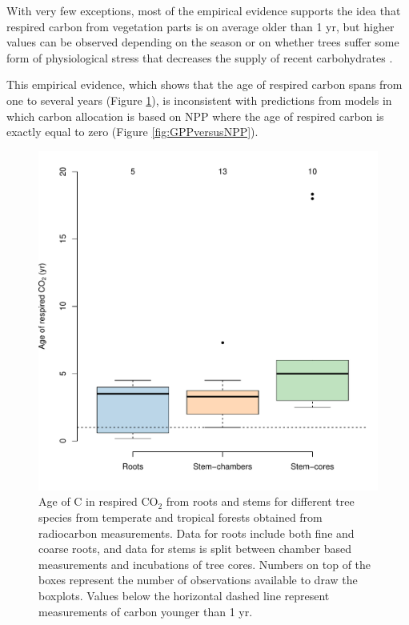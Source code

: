 \documentclass[bg, manuscript]{copernicus}
\begin{document}
With very few exceptions, most of the empirical evidence supports the idea that respired carbon from vegetation parts is on average older than 1 yr, but higher values can be observed depending on the season or on whether trees suffer some form of physiological stress that decreases the supply of recent carbohydrates \citep{Herrera2020}. 

This empirical evidence, which shows that the age of respired carbon spans from one to several years (Figure \ref{fig:ageRespiredC}), is inconsistent with predictions from models in which carbon allocation is based on NPP where the age of respired carbon is exactly equal to zero (Figure \ref{fig:GPPversusNPP}). 

\begin{figure}[t]
   \centering
   \includegraphics[scale=0.8]{ageRespiredC.pdf} %
   \caption{Age of C in respired CO$_2$ from roots and stems for different tree species from temperate and tropical forests obtained from radiocarbon measurements. Data for roots include both fine and coarse roots, and data for stems is split between chamber based measurements and incubations of tree cores. Numbers on top of the boxes represent the number of observations available to draw the boxplots. Values below the horizontal dashed line represent measurements of carbon younger than 1 yr.} 
   \label{fig:ageRespiredC}
\end{figure}
\end{document}

